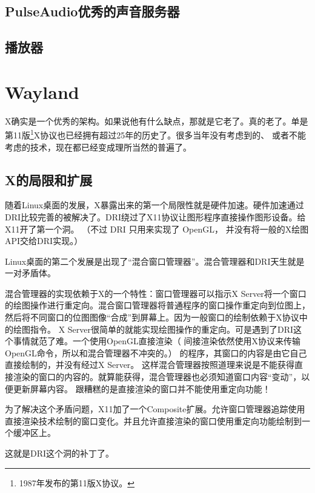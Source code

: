 \subsection{PulseAudio优秀的声音服务器}
\subsection{播放器}

\section{Wayland}

X确实是一个优秀的架构。如果说他有什么缺点，那就是它老了。真的老了。单是第11版\footnote{1987年发布的第11版X协议。}X协议也已经拥有超过25年的历史了。很多当年没有考虑到的、
或者不能考虑的技术，现在都已经变成理所当然的普遍了。

\subsection{X的局限和扩展}

随着Linux桌面的发展，X暴露出来的第一个局限性就是硬件加速。硬件加速通过DRI比较完善的被解决了。DRI绕过了X11协议让图形程序直接操作图形设备。给X11开了第一个洞。
（不过 DRI 只用来实现了 OpenGL， 并没有将一般的X绘图API交给DRI实现。）

Linux桌面的第二个发展是出现了“混合窗口管理器”。混合管理器和DRI天生就是一对矛盾体。

\begin{insertnote}

混合管理器的实现依赖于X的一个特性：窗口管理器可以指示X Server将一个窗口的绘图操作进行重定向。混合窗口管理器将普通程序的窗口操作重定向到位图上，然后将不同窗口的位图图像“合成”到屏幕上。因为一般窗口的绘制依赖于X协议中的绘图指令。
X Server很简单的就能实现绘图操作的重定向。可是遇到了DRI这个事情就范了难。一个使用OpenGL直接渲染（ 间接渲染依然使用X协议来传输OpenGL命令，所以和混合管理器不冲突的。）
的程序，其窗口的内容是由它自己直接绘制的，并没有经过X Server。 这样混合管理器按照道理来说是不能获得直接渲染的窗口的内容的。就算能获得，混合管理器也必须知道窗口内容“变动”，以便更新屏幕内容。
跟糟糕的是直接渲染的窗口并不能使用重定向功能！
\end{insertnote}

为了解决这个矛盾问题，X11加了一个Composite扩展。允许窗口管理器追踪使用直接渲染技术绘制的窗口变化。并且允许直接渲染的窗口使用重定向功能绘制到一个缓冲区上。

这就是DRI这个洞的补丁了。

